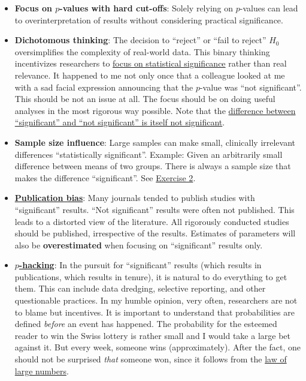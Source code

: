 \documentclass[
]{book}
\begin{document}
\begin{itemize}
\item
  \textbf{Focus on \(p\)-values with hard cut-offs}: Solely relying on \(p\)-values can lead to overinterpretation of
  results without considering practical significance.
\item
  \textbf{Dichotomous thinking}: The decision to ``reject'' or ``fail to reject'' \(H_0\)
  oversimplifies the complexity of real-world data. This binary thinking
  incentivizes researchers to \href{https://www.tandfonline.com/doi/full/10.1080/00031305.2018.1447512}{focus on statistical significance}
  rather than real relevance. It happened to me not only once that a colleague
  looked at me with a sad facial expression announcing that the \(p\)-value was ``not significant''.
  This should be not an issue at all. The focus should be on doing useful analyses in the most
  rigorous way possible. Note that the \href{https://www.tandfonline.com/doi/abs/10.1198/000313006x152649?casa_token=mn4mIBOnoaIAAAAA:RmZ3RZ6prFHNPWte07aNMKidAsQGmqsjPdCQCpXraH8MCmFuftZmXTsLNzeSLFmXdgJm0Xd8dklEKZdPUw}{difference between ``significant'' and ``not significant'' is
  itself not significant}.
\item
  \textbf{Sample size influence}: Large samples can make small, clinically irrelevant
  differences ``statistically significant''. Example: Given an arbitrarily small difference between means of two groups. There is
  always a sample size that makes the difference ``significant''. See \hyperref[exercise2_nhst]{Exercise 2}.
\item
  \textbf{\href{https://en.wikipedia.org/wiki/Publication_bias}{Publication bias}}: Many journals tended to publish studies with ``significant'' results. ``Not significant'' results
  were often not published. This leads to a distorted view of the literature. All rigorously
  conducted studies should be published, irrespective of the results. Estimates of parameters will also be \textbf{overestimated}
  when focusing on ``significant'' results only.
\item
  \textbf{\href{https://de.wikipedia.org/wiki/P-Hacking}{\(p\)-hacking}}: In the pursuit for ``significant'' results
  (which results in publications, which results in tenure), it is natural to do everything to get them.
  This can include data dredging, selective reporting, and other questionable practices.
  In my humble opinion, very often, researchers are not to blame but incentives. It is important to understand
  that probabilities are defined \emph{before} an event has happened. The probability for the esteemed reader to win the
  Swiss lottery is rather small and I would take a large bet against it. But every week, someone wins (approximately).
  After the fact, one should not be surprised \emph{that} someone won,
  since it follows from the \href{https://en.wikipedia.org/wiki/Law_of_large_numbers}{law of large numbers}.
\end{itemize}
\end{document}
